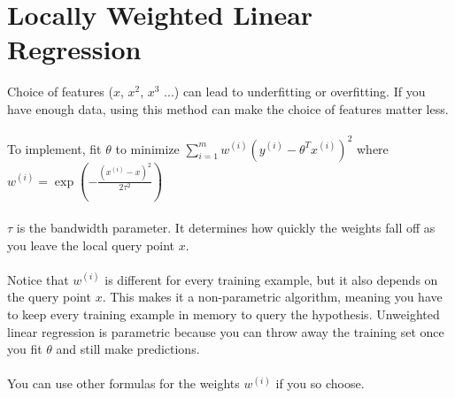 \documentclass{article}
\begin{document}
\section{Locally Weighted Linear Regression}


Choice of features ($x$, $x^2$, $x^3$ ...) can lead to underfitting or overfitting. If you have enough data, using this method can make the choice of features matter less.\\
\\
To implement, fit $\theta$ to minimize $\sum_{i=1}^m w^{(i)}{(y^{(i)} - \theta^Tx^{(i)})}^2$ where 
$w^{(i)}=\exp(-\frac{{(x^{(i)} - x)}^2}{2\tau^2})$\\
\\
$\tau$ is the bandwidth parameter. It determines how quickly the weights fall off as you leave the local query point $x$.\\
\\
Notice that $w^{(i)}$ is different for every training example, but it also depends on the query point $x$. This makes it a non-parametric algorithm, meaning you have to keep every training example in memory to query the hypothesis. Unweighted linear regression is parametric because you can throw away the training set once you fit $\theta$ and still make predictions.\\
\\
You can use other formulas for the weights $w^{(i)}$ if you so choose.\\
\end{document}
